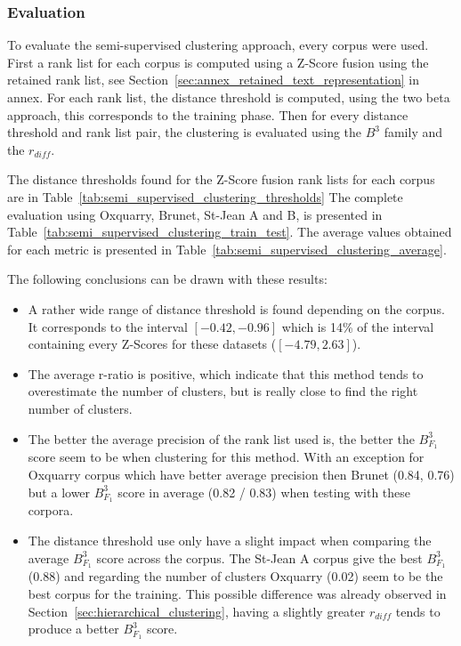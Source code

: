 \subsubsection{Evaluation}

To evaluate the semi-supervised clustering approach, every corpus were used.
First a rank list for each corpus is computed using a Z-Score fusion using the retained rank list, see Section~\ref{sec:annex_retained_text_representation} in annex.
For each rank list, the distance threshold is computed, using the two beta approach, this corresponds to the training phase.
Then for every distance threshold and rank list pair, the clustering is evaluated using the $B^3$ family and the $r_{diff}$.

The distance thresholds found for the Z-Score fusion rank lists for each corpus are in Table~\ref{tab:semi_supervised_clustering_thresholds}
The complete evaluation using Oxquarry, Brunet, St-Jean A and B, is presented in Table~\ref{tab:semi_supervised_clustering_train_test}.
The average values obtained for each metric is presented in Table~\ref{tab:semi_supervised_clustering_average}.

The following conclusions can be drawn with these results:
\begin{itemize}
  \item
  A rather wide range of distance threshold is found depending on the corpus.
  It corresponds to the interval $\left[-0.42, -0.96\right]$ which is 14\% of the interval containing every Z-Scores for these datasets ($\left[-4.79, 2.63\right]$).
  \item
  The average r-ratio is positive, which indicate that this method tends to overestimate the number of clusters, but is really close to find the right number of clusters.
  \item
  The better the average precision of the rank list used is, the better the $B^3_{F_1}$ score seem to be when clustering for this method.
  With an exception for Oxquarry corpus which have better average precision then Brunet (0.84, 0.76) but a lower $B^3_{F_1}$ score in average (0.82 / 0.83) when testing with these corpora.
  \item
  The distance threshold use only have a slight impact when comparing the average $B^3_{F_1}$ score across the corpus.
  The St-Jean A corpus give the best $B^3_{F_1}$ (0.88) and regarding the number of clusters Oxquarry (0.02) seem to be the best corpus for the training.
  This possible difference was already observed in Section~\ref{sec:hierarchical_clustering}, having a slightly greater $r_{diff}$ tends to produce a better $B^3_{F_1}$ score.
\end{itemize}


